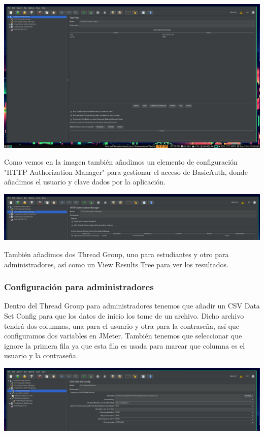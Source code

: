 \documentclass[12pt, spanish]{article}
\begin{document}
\begin{center}
\includegraphics[scale=0.25]{jmeter-1.png}
\end{center}

Como vemos en la imagen también añadimos un elemento de configuración "HTTP Authorization Manager" para gestionar el acceso de BasicAuth, donde añadimos el usuario y clave dados por la aplicación.


\begin{center}
\includegraphics[scale=0.25]{jmeter-2.png}
\end{center}

También añadimos dos Thread Group, uno para estudiantes y otro para administradores, así como un View Results Tree para ver los resultados.


\subsubsection{Configuración para administradores}

Dentro del Thread Group para administradores tenemos que añadir un CSV Data Set Config para que los datos de inicio los tome de un archivo. Dicho archivo tendrá dos columnas, una para el usuario y otra para la contraseña, así que configuramos dos variables en JMeter. También tenemos que seleccionar que ignore la primera fila ya que esta fila es usada para marcar que columna es el usuario y la contraseña.

\begin{center}
\includegraphics[scale=0.25]{jmeter-3.png}
\end{center}
\end{document}

